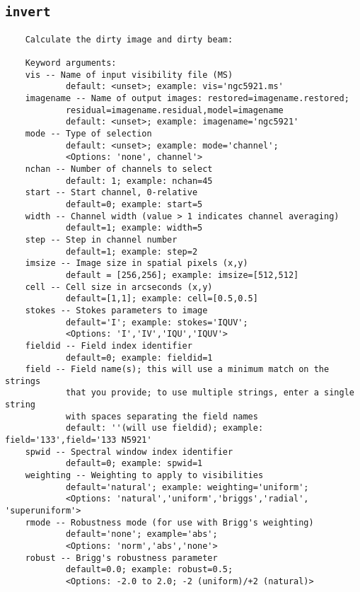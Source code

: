 \subsection{{\tt invert}}
\label{section:tasks.invert}

\small
\begin{verbatim}
    Calculate the dirty image and dirty beam:
    
    Keyword arguments:
    vis -- Name of input visibility file (MS)
            default: <unset>; example: vis='ngc5921.ms'
    imagename -- Name of output images: restored=imagename.restored;
            residual=imagename.residual,model=imagename
            default: <unset>; example: imagename='ngc5921'
    mode -- Type of selection 
            default: <unset>; example: mode='channel'; 
            <Options: 'none', channel'>
    nchan -- Number of channels to select
            default: 1; example: nchan=45
    start -- Start channel, 0-relative
            default=0; example: start=5
    width -- Channel width (value > 1 indicates channel averaging)
            default=1; example: width=5
    step -- Step in channel number
            default=1; example: step=2      
    imsize -- Image size in spatial pixels (x,y)
            default = [256,256]; example: imsize=[512,512]
    cell -- Cell size in arcseconds (x,y)
            default=[1,1]; example: cell=[0.5,0.5]
    stokes -- Stokes parameters to image
            default='I'; example: stokes='IQUV'; 
            <Options: 'I','IV','IQU','IQUV'>
    fieldid -- Field index identifier
            default=0; example: fieldid=1
    field -- Field name(s); this will use a minimum match on the strings
            that you provide; to use multiple strings, enter a single string
            with spaces separating the field names
            default: ''(will use fieldid); example: field='133',field='133 N5921'
    spwid -- Spectral window index identifier
            default=0; example: spwid=1
    weighting -- Weighting to apply to visibilities
            default='natural'; example: weighting='uniform'; 
            <Options: 'natural','uniform','briggs','radial', 'superuniform'>
    rmode -- Robustness mode (for use with Brigg's weighting)
            default='none'; example='abs'; 
            <Options: 'norm','abs','none'>
    robust -- Brigg's robustness parameter 
            default=0.0; example: robust=0.5; 
            <Options: -2.0 to 2.0; -2 (uniform)/+2 (natural)>
\end{verbatim}
\normalsize


